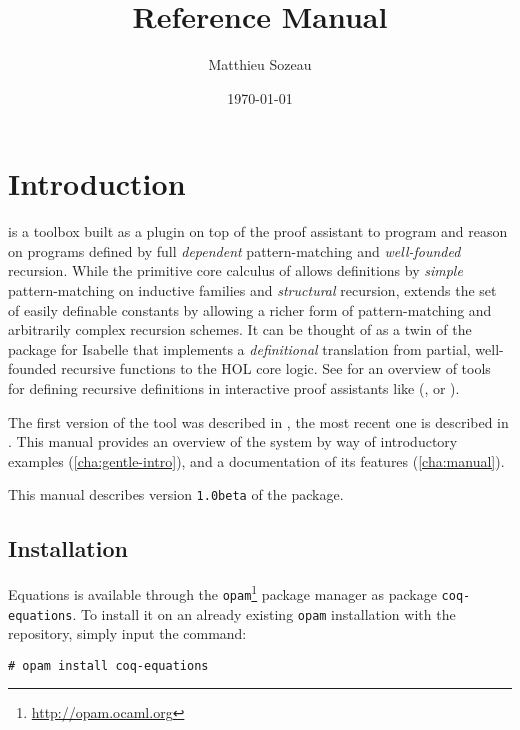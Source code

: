 \documentclass{report}
\author{Matthieu Sozeau}
\date{\today}
\title{\Equations \eqnversion Reference Manual}
\def\eqnversion{\texttt{1.0beta}\xspace}
\begin{document}
\maketitle

\def\coqlibrary#1#2#3{}

\def\Equations{\texorpdfstring{\name{Equations}}{Equations}}

\chapter*{Introduction}
\label{cha:introduction}

\Equations is a toolbox built as a plugin on top of the \Coq proof assistant
to program and reason on programs defined by full \emph{dependent}
pattern-matching and \emph{well-founded} recursion. While the primitive
core calculus of \Coq allows definitions by \emph{simple} pattern-matching on
inductive families and \emph{structural} recursion, \Equations extends
the set of easily definable constants by allowing a richer form of
pattern-matching and arbitrarily complex recursion schemes. It can be
thought of as a twin of the  package for Isabelle that
implements a \emph{definitional} translation from partial, well-founded
recursive functions to the HOL core logic. See
\cite{BoveKraussSozeau2011} for an overview of tools for defining
recursive definitions in interactive proof assistants like (\Coq, \Agda
or \Isabelle).

The first version of the tool was described in
\cite{sozeau.Coq/Equations/ITP10}, the most recent one is described in
\cite{mansoz17}. This manual provides an overview of the system by way
of introductory examples (\autoref{cha:gentle-intro}), and a
documentation of its features (\autoref{cha:manual}).

This manual describes version \eqnversion of the package.

\section*{Installation}

Equations is available through the
\texttt{opam}\footnote{\url{http://opam.ocaml.org}} package manager as
package \texttt{coq-equations}. To install it on an already existing
\texttt{opam} installation with the \Coq repository, simply input the
command:
\begin{verbatim}
# opam install coq-equations
\end{verbatim}
\end{document}
